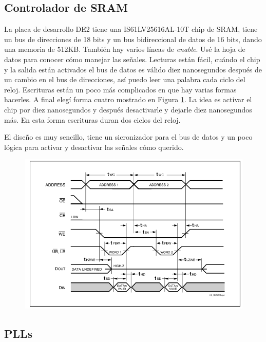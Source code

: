 \documentclass[a4paper]{article}
\begin{document}
\subsection{Controlador de SRAM}

La placa de desarrollo DE2 tiene una IS61LV25616AL-10T chip de SRAM, tiene un bus de direcciones de 18 bits y un bus bidireccional de datos de 16 bits, dando una memoria de 512KB. También hay varios líneas de \textit{enable}. Usé la hoja de datos para conocer cómo manejar las señales. Lecturas están fácil, cuándo el chip y la salida están activados el bus de datos es válido diez nanosegundos después de un cambio en el bus de direcciones, así puedo leer una palabra cada ciclo del reloj. Escrituras están un poco más complicados en que hay varias formas hacerles. A final elegí forma cuatro mostrado en Figura \ref{fig:sram_write}. La idea es activar el chip por diez nanosegundos y después desactivarle y dejarle diez nanosegundos más. En esta forma escrituras duran dos ciclos del reloj.

El diseño es muy sencillo, tiene un sicronizador para el bus de datos y un poco lógica para activar y desactivar las señales cómo querido.

\begin{figure}[!h]
\includegraphics[width=15cm]{img/sram_write.png}
\label{fig:sram_write}
\end{figure}

\subsection{PLLs}
\end{document}
